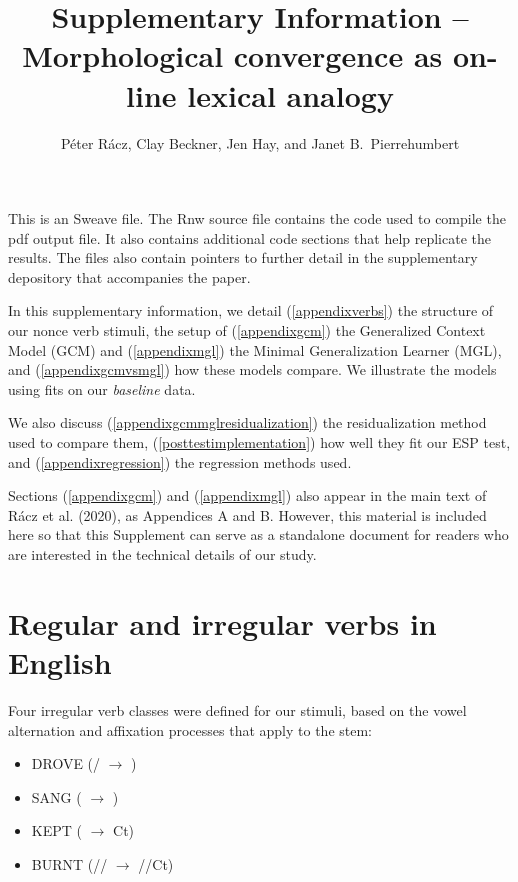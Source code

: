 \documentclass[12pt]{article}
\title{Supplementary Information -- Morphological convergence as on-line lexical analogy}
\author{P\'eter R\'acz, Clay Beckner, Jen Hay, and Janet B.\ Pierrehumbert}
\begin{document}



\maketitle

\noindent This is an Sweave file. The Rnw source file contains the code used to compile the pdf output file. It also contains additional code sections that help replicate the results. The files also contain pointers to further detail in the supplementary depository that accompanies the paper. 

\noindent In this supplementary information, we detail (\ref{appendixverbs}) the structure of our nonce verb stimuli, the setup of (\ref{appendixgcm}) the Generalized Context Model (GCM) and (\ref{appendixmgl}) the Minimal Generalization Learner (MGL), and (\ref{appendixgcmvsmgl}) how these models compare. 
We illustrate the models using fits on our \emph {baseline} data. 

We also discuss (\ref{appendixgcmmglresidualization}) the residualization method used to compare them, (\ref{posttestimplementation}) how well they fit our ESP test, and (\ref{appendixregression}) the regression methods used.

Sections (\ref{appendixgcm}) and (\ref{appendixmgl}) also appear in the main text of  R\'acz et al. (2020), as Appendices A and B. However, this material is included here so that this Supplement can serve as a standalone document for readers who are interested in the technical details of our study. 

\section{Regular and irregular verbs in English \label{appendixverbs}}

Four irregular verb classes were defined for our stimuli, based on the vowel alternation and affixation processes that apply to the stem:

\begin{itemize}
    \item DROVE (\textipa{[aI]}/\textipa{[i]} $\rightarrow{}$ \textipa{[oU]})
    \item SANG (\textipa{[I]} $\rightarrow{}$ \textipa{[\ae]})
    \item KEPT (\textipa{[i]} $\rightarrow{}$ \textipa{[E]}Ct)
    \item BURNT (\textipa{[3]}/\textipa{[E]}/\textipa{[I]} $\rightarrow{}$ \textipa{[3]}/\textipa{[E]}/\textipa{[I]}Ct)
\end{itemize}
\end{document}
